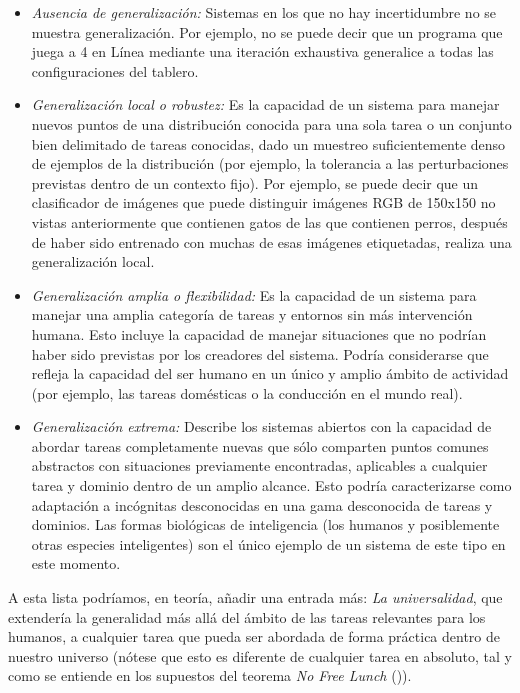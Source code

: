 \begin{itemize}
\item \textit{Ausencia de generalización:} Sistemas en los que no hay incertidumbre no se muestra generalización. Por ejemplo, no se puede decir que un programa que juega a 4 en Línea mediante una iteración exhaustiva generalice a todas las configuraciones del tablero.

\item \textit{Generalización local o robustez:} Es la capacidad de un sistema para manejar nuevos puntos de una distribución conocida para una sola tarea o un conjunto bien delimitado de tareas conocidas, dado un muestreo suficientemente denso de ejemplos de la distribución (por ejemplo, la tolerancia a las perturbaciones previstas dentro de un contexto fijo). Por ejemplo, se puede decir que un clasificador de imágenes que puede distinguir imágenes RGB de 150x150 no vistas anteriormente que contienen gatos de las que contienen perros, después de haber sido entrenado con muchas de esas imágenes etiquetadas, realiza una generalización local. 

\item \textit{Generalización amplia o flexibilidad:} Es la capacidad de un sistema para manejar una amplia categoría de tareas y entornos sin más intervención humana. Esto incluye la capacidad de manejar situaciones que no podrían haber sido previstas por los creadores del sistema. Podría considerarse que refleja la capacidad del ser humano en un único y amplio ámbito de actividad (por ejemplo, las tareas domésticas o la conducción en el mundo real).

\item \textit{Generalización extrema:} Describe los sistemas abiertos con la capacidad de abordar tareas completamente nuevas que sólo comparten puntos comunes abstractos con situaciones previamente encontradas, aplicables a cualquier tarea y dominio dentro de un amplio alcance. Esto podría caracterizarse como adaptación a incógnitas desconocidas en una gama desconocida de tareas y dominios. Las formas biológicas de inteligencia (los humanos y posiblemente otras especies inteligentes) son el único ejemplo de un sistema de este tipo en este momento.
\end{itemize}

A esta lista podríamos, en teoría, añadir una entrada más: \textit{La universalidad}, que extendería la generalidad más allá del ámbito de las tareas relevantes para los humanos, a cualquier tarea que pueda ser abordada de forma práctica dentro de nuestro universo (nótese que esto es diferente de cualquier tarea en absoluto, tal y como se entiende en los supuestos del teorema \textit{No Free Lunch} (\cite{wolpert1997no})).


